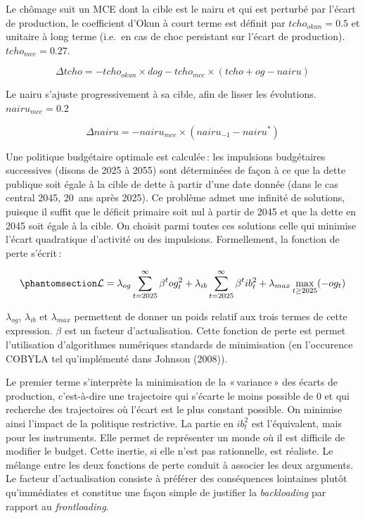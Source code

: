 \documentclass[
  french,
  9pt,
  a4paper,
  DIV=11,
  twoside=semi]{scrreprt}
\begin{document}
Le chômage suit un MCE dont la cible est le nairu et qui est perturbé
par l'écart de production, le coefficient d'Okun à court terme est
définit par \(tcho_{okun}=0.5\) et unitaire à long terme (i.e.~en cas de
choc persistant sur l'écart de production). \(tcho_{mce}=0.27\).

\[
\Delta tcho = - tcho_{okun} \times dog - tcho_{mce} \times (tcho+og-nairu)
\]

Le nairu s'ajuste progressivement à sa cible, afin de lisser les
évolutions. \(nairu_{mce}=0.2\)

\[
\Delta nairu = - nairu_{mce} \times (nairu_{-1} - nairu^*)
\]

Une politique budgétaire optimale est calculée\,: les impulsions
budgétaires successives (disons de 2025 à 2055) sont déterminées de
façon à ce que la dette publique soit égale à la cible de dette à partir
d'une date donnée (dans le cas central 2045, 20~ans après 2025). Ce
problème admet une infinité de solutions, puisque il suffit que le
déficit primaire soit nul à partir de 2045 et que la dette en 2045 soit
égale à la cible. On choisit parmi toutes ces solutions celle qui
minimise l'écart quadratique d'activité ou des impulsions. Formellement,
la fonction de perte s'écrit\,:

\begin{equation}\protect\phantomsection\label{eq-perte-quad}{
\mathcal{L} = \lambda_{og}\sum_{t=2025}^{\infty} \beta^t og_t^2 + \lambda_{ib} \sum_{t=2025}^{\infty} \beta^t ib_t^2 + \lambda_{max} \max_{t\geq 2025}(-og_t)
}\end{equation}

\(\lambda_{og}\), \(\lambda_{ib}\) et \(\lambda_{max}\) permettent de
donner un poids relatif aux trois termes de cette expression. \(\beta\)
est un facteur d'actualisation. Cette fonction de perte est permet
l'utilisation d'algorithmes numériques standards de minimisation (en
l'occurence COBYLA tel qu'implémenté dans Johnson (2008)).

Le premier terme s'interprète la minimisation de la «\,variance\,» des
écarts de production, c'est-à-dire une trajectoire qui s'écarte le moins
possible de 0 et qui recherche des trajectoires où l'écart est le plus
constant possible. On minimise ainsi l'impact de la politique
restrictive. La partie en \(ib_t^2\) est l'équivalent, mais pour les
instruments. Elle permet de représenter un monde où il est difficile de
modifier le budget. Cette inertie, si elle n'est pas rationnelle, est
réaliste. Le mélange entre les deux fonctions de perte conduit à
associer les deux arguments. Le facteur d'actualisation consiste à
préférer des conséquences lointaines plutôt qu'immédiates et constitue
une façon simple de justifier la \emph{backloading} par rapport au
\emph{frontloading}.
\end{document}
